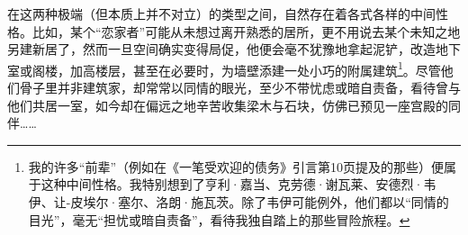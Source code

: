 在这两种极端（但本质上并不对立）的类型之间，自然存在着各式各样的中间性格。比如，某个“恋家者”可能从未想过离开熟悉的居所，更不用说去某个未知之地另建新居了，然而一旦空间确实变得局促，他便会毫不犹豫地拿起泥铲，改造地下室或阁楼，加高楼层，甚至在必要时，为墙壁添建一处小巧的附属建筑\footnote{我的许多“前辈”（例如在《一笔受欢迎的债务》引言第10页提及的那些）便属于这种中间性格。我特别想到了亨利·嘉当、克劳德·谢瓦莱、安德烈·韦伊、让-皮埃尔·塞尔、洛朗·施瓦茨。除了韦伊可能例外，他们都以“同情的目光”，毫无“担忧或暗自责备”，看待我独自踏上的那些冒险旅程。}。尽管他们骨子里并非建筑家，却常常以同情的眼光，至少不带忧虑或暗自责备，看待曾与他们共居一室，如今却在偏远之地辛苦收集梁木与石块，仿佛已预见一座宫殿的同伴……